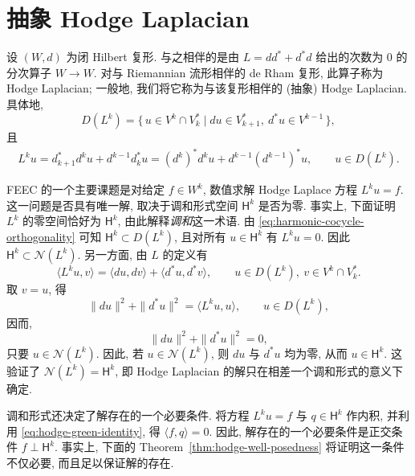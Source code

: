 \section{{抽象 Hodge Laplacian}}\label{sec:abstract-hodge-laplacian}

{设 $(W,d)$ 为闭 Hilbert 复形. 与之相伴的是由 $L=dd^*+d^*d$ 给出的次数为 $0$ 的分次算子 $W\to W$. 对与 Riemannian 流形相伴的 de Rham 复形, 此算子称为 Hodge Laplacian; 一般地, 我们将它称为与该复形相伴的 (抽象) Hodge Laplacian. 具体地,}
\begin{equation}\label{eq:abstract-hodge-domain}
D(L^k)=\{\,u\in V^k\cap V_k^*\mid du\in V_{k+1}^*,\ d^*u\in V^{k-1}\,\},
\end{equation}
{且}
\begin{equation}\label{eq:abstract-hodge-operator}
\begin{gathered}
L^k u=d_{k+1}^*d^k u+d^{k-1}d_k^*u=(d^k)^*d^k u+d^{k-1}(d^{k-1})^*u,\qquad u\in D(L^k).
\end{gathered}
\end{equation}

{FEEC 的一个主要课题是对给定 $f\in W^k$, 数值求解 Hodge Laplace 方程 $L^k u=f$. 这一问题是否具有唯一解, 取决于调和形式空间 $\mathsf H^k$ 是否为零. 事实上, 下面证明 $L^k$ 的零空间恰好为 $\mathsf H^k$, 由此解释\emph{调和}这一术语. 由 \eqref{eq:harmonic-cocycle-orthogonality} 可知 $\mathsf H^k\subset D(L^k)$, 且对所有 $u\in\mathsf H^k$ 有 $L^k u=0$. 因此 $\mathsf H^k\subset\mathcal N(L^k)$. 另一方面, 由 $L$ 的定义有}
\begin{equation}\label{eq:hodge-green-identity}
\langle L^k u,v\rangle=\langle du,dv\rangle+\langle d^*u,d^*v\rangle,\qquad u\in D(L^k),\ v\in V^k\cap V_k^*.
\end{equation}
{取 $v=u$, 得}
\[
\|du\|^2+\|d^*u\|^2=\langle L^k u,u\rangle,\qquad u\in D(L^k),
\]
{因而,}
\[
\|du\|^2+\|d^*u\|^2=0,
\]
{只要 $u\in\mathcal N(L^k)$. 因此, 若 $u\in\mathcal N(L^k)$, 则 $du$ 与 $d^*u$ 均为零, 从而 $u\in\mathsf H^k$. 这验证了 $\mathcal N(L^k)=\mathsf H^k$, 即 Hodge Laplacian 的解只在相差一个调和形式的意义下确定.}

{调和形式还决定了解存在的一个必要条件. 将方程 $L^k u=f$ 与 $q\in\mathsf H^k$ 作内积, 并利用 \eqref{eq:hodge-green-identity}, 得 $\langle f,q\rangle=0$. 因此, 解存在的一个必要条件是正交条件 $f\perp\mathsf H^k$. 事实上, 下面的 Theorem~\ref{thm:hodge-well-posedness} 将证明这一条件不仅必要, 而且足以保证解的存在.}

